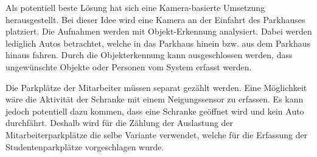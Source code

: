 Als potentiell beste Lösung hat sich eine Kamera-basierte Umsetzung herausgestellt. Bei dieser Idee wird eine Kamera an der Einfahrt des Parkhauses platziert. Die Aufnahmen werden mit Objekt-Erkennung analysiert. Dabei werden lediglich Autos betrachtet, welche in das Parkhaus hinein bzw. aus dem Parkhaus hinaus fahren. Durch die Objekterkennung kann ausgeschlossen werden, dass ungewünschte Objekte oder Personen vom System erfasst werden. 

Die Parkplätze der Mitarbeiter müssen separat gezählt werden. Eine Möglichkeit wäre die Aktivität der Schranke mit einem Neigungssensor zu erfassen. Es kann jedoch potentiell dazu kommen, dass eine Schranke geöffnet wird und kein Auto durchfährt. Deshalb wird für die Zählung der Auslastung der Mitarbeiterparkplätze die selbe Variante verwendet, welche für die Erfassung der Studentenparkplätze vorgeschlagen wurde. 

